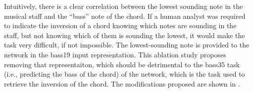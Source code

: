 
Intuitively, there is a clear correlation between the lowest
sounding note in the musical staff and the ``bass'' note of
the chord. If a human analyst was required to indicate the
inversion of a chord knowing which notes are sounding in the
staff, but not knowing which of them is sounding the lowest,
it would make the task very difficult, if not impossible.
The lowest-sounding note is provided to the network in the
\gls{bass19} input representation. This ablation study
proposes removing that representaiton, which should be
detrimental to the \gls{bass35} task (i.e., predicting the
bass of the chord) of the network, which is the task used to
retrieve the inversion of the chord. The
modifications proposed are shown in .

